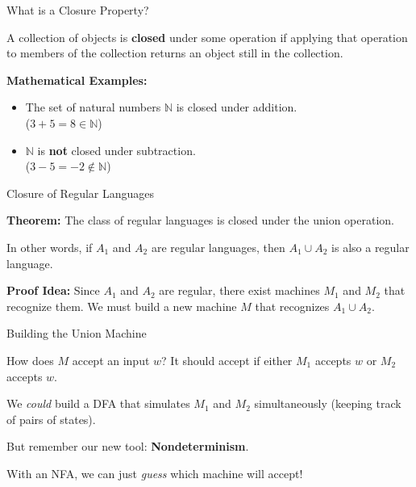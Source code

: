 \documentclass[10pt,aspectratio=169]{beamer}
\begin{document}
\begin{frame}{What is a Closure Property?}

A collection of objects is \textbf{closed} under some operation if applying that operation to members of the collection returns an object still in the collection.

\vspace{1em}

\textbf{Mathematical Examples:}
\begin{itemize}
    \item The set of natural numbers $\mathbb{N}$ is closed under addition. \\ ($3 + 5 = 8 \in \mathbb{N}$)
    \item $\mathbb{N}$ is \textbf{not} closed under subtraction. \\ ($3 - 5 = -2 \notin \mathbb{N}$)
\end{itemize}

\end{frame}

\begin{frame}{Closure of Regular Languages}

\textbf{Theorem:} The class of regular languages is closed under the union operation.

\vspace{1em}

In other words, if $A_1$ and $A_2$ are regular languages, then $A_1 \cup A_2$ is also a regular language.

\vspace{1em}
\pause

\textbf{Proof Idea:} 
Since $A_1$ and $A_2$ are regular, there exist machines $M_1$ and $M_2$ that recognize them. We must build a new machine $M$ that recognizes $A_1 \cup A_2$.

\end{frame}

\begin{frame}{Building the Union Machine}

How does $M$ accept an input $w$?
It should accept if either $M_1$ accepts $w$ or $M_2$ accepts $w$.

\vspace{1em}

We \textit{could} build a DFA that simulates $M_1$ and $M_2$ simultaneously (keeping track of pairs of states). 

\vspace{1em}
\pause
But remember our new tool: \textbf{Nondeterminism}.

With an NFA, we can just \textit{guess} which machine will accept!

\end{frame}
\end{document}
